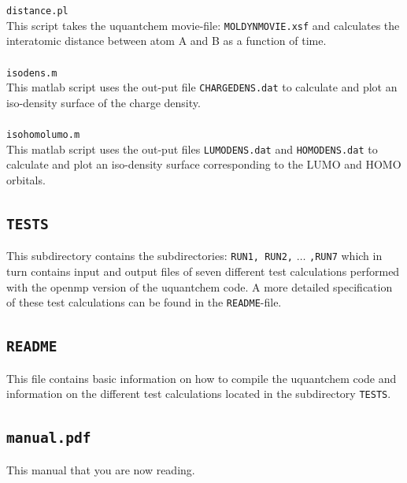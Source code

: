\documentclass[a4paper,twoside,openany]{book}
\begin{document}
{{\texttt{distance.pl}\\
This script takes the uquantchem movie-file: \texttt{MOLDYNMOVIE.xsf}
and calculates the interatomic distance between atom A and B
as a function of time.\\ \\
\texttt{isodens.m}\\
This matlab script uses the out-put file \texttt{CHARGEDENS.dat} to calculate and plot an iso-density surface of the charge density.\\ \\
\texttt{isohomolumo.m}\\
This matlab script uses the out-put files \texttt{LUMODENS.dat} and \texttt{HOMODENS.dat}  to calculate and plot an iso-density surface corresponding to the LUMO and HOMO orbitals. 
\subsection{\texttt{TESTS}}
This subdirectory contains the subdirectories:  \texttt{RUN1, RUN2,} $\ldots$ \texttt{,RUN7} which in turn contains input and output files of seven different test calculations performed with the openmp 
version of the uquantchem code. A more detailed specification of these test calculations can be found in the \texttt{README}-file.
\subsection{\texttt{README}}
This file contains basic information on how to compile the uquantchem code and information on the different test calculations located in the subdirectory \texttt{TESTS}.
\subsection{\texttt{manual.pdf}}
This manual that you are now reading.
}}
\end{document}
